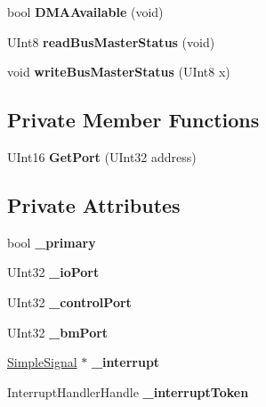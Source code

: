 \begin{DoxyCompactItemize}
\mbox{\label{class_a_t_a_driver_node___p_c_i_a3e8d76e23a4858280ab1b0bcc935d3c4}} 
bool {\bfseries D\+M\+A\+Available} (void)
\item 
\mbox{\label{class_a_t_a_driver_node___p_c_i_a8ea1f7fe16a942402b46ac65e5349522}} 
U\+Int8 {\bfseries read\+Bus\+Master\+Status} (void)
\item 
\mbox{\label{class_a_t_a_driver_node___p_c_i_a64ff7d4170b18c49743ab195328b0eab}} 
void {\bfseries write\+Bus\+Master\+Status} (U\+Int8 x)
\end{DoxyCompactItemize}
\subsection*{Private Member Functions}
\begin{DoxyCompactItemize}
\item 
\mbox{\label{class_a_t_a_driver_node___p_c_i_a1d7520ac832dcbd8a7d4b74a31c862b8}} 
U\+Int16 {\bfseries Get\+Port} (U\+Int32 address)
\end{DoxyCompactItemize}
\subsection*{Private Attributes}
\begin{DoxyCompactItemize}
\item 
\mbox{\label{class_a_t_a_driver_node___p_c_i_a9d5ddedaf82426be62dc1dd9c6cb8fa1}} 
bool {\bfseries \+\_\+primary}
\item 
\mbox{\label{class_a_t_a_driver_node___p_c_i_adf530c62d89628ca43316a5004aa710c}} 
U\+Int32 {\bfseries \+\_\+io\+Port}
\item 
\mbox{\label{class_a_t_a_driver_node___p_c_i_a7162b2098283f9a19ea38d8285ee6396}} 
U\+Int32 {\bfseries \+\_\+control\+Port}
\item 
\mbox{\label{class_a_t_a_driver_node___p_c_i_a5e3ed984e876bc66dc895b40a6db70ae}} 
U\+Int32 {\bfseries \+\_\+bm\+Port}
\item 
\mbox{\label{class_a_t_a_driver_node___p_c_i_a19ef9cef9b3eec0d968e00665534a190}} 
\hyperlink{class_simple_signal}{Simple\+Signal} $\ast$ {\bfseries \+\_\+interrupt}
\item 
\mbox{\label{class_a_t_a_driver_node___p_c_i_a1f984269864e2349109732446229ef07}} 
Interrupt\+Handler\+Handle {\bfseries \+\_\+interrupt\+Token}
\end{DoxyCompactItemize}
